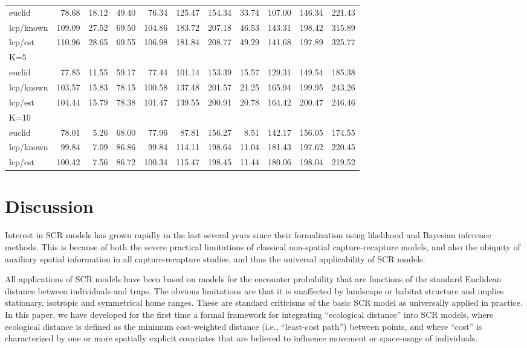 \documentclass[12pt]{article}
\begin{document}
\begin{table}[h]
{\begin{tabular}{lrrrrrrrrrr}
euclid   &  78.68 & 18.12& 49.40 & 76.34 & 125.47 & 154.34& 33.74& 107.00& 146.34& 221.43\\
lcp/known& 109.09 & 27.52& 69.50 &104.86 & 183.72 & 207.18& 46.53& 143.31& 198.42& 315.89\\
lcp/est  & 110.96 & 28.65& 69.55 &106.98 & 181.84 & 208.77& 49.29& 141.68& 197.89& 325.77\\
K=5      &        &      &       &       &        &       &      &       &       &        \\
euclid   &  77.85 & 11.55& 59.17 & 77.44 & 101.14 & 153.39& 15.57& 129.31& 149.54& 185.38\\
lcp/known& 103.57 & 15.83& 78.15 &100.58 & 137.48 & 201.57& 21.25& 165.94& 199.95& 243.26\\
lcp/est  & 104.44 & 15.79& 78.38 &101.47 & 139.55 & 200.91& 20.78& 164.42& 200.47& 246.46\\
K=10     &        &      &       &       &        &       &      &       &       &       \\
euclid   &  78.01 & 5.26 & 68.00 & 77.96 & 87.81  & 156.27&  8.51& 142.17& 156.05& 174.55\\
lcp/known&  99.84 & 7.09 & 86.86 & 99.84 & 114.11 & 198.64& 11.04& 181.43& 197.62& 220.45\\
lcp/est  & 100.42 & 7.56 & 86.72 &100.34 & 115.47 & 198.45& 11.44& 180.06& 198.04& 219.52\\
\end{tabular}
}
\end{table}


\section{Discussion}

Interest in SCR models has grown rapidly in the last several years
since their formalization using likelihood \citep{borchers_efford:2008}
and Bayesian \citep{royle_young:2008} inference methods. This is because
of both the severe practical limitations of classical non-spatial
capture-recapture models, and also the ubiquity of auxiliary spatial
information in all capture-recapture studies, and thus the universal
applicability of SCR models.

All applications of SCR models have been based on models for the
encounter probability that are functions of
the standard Euclidean distance between
individuals and traps. The obvious limitations are that it is
unaffected by landscape or habitat structure and implies
stationary,  isotropic and symmetrical home ranges. These are standard
criticisms of the basic SCR model as universally applied in practice.
In this paper,  we have developed for the first time a formal framework
for integrating
``ecological distance'' into SCR models, where ecological distance is
defined as the minimum cost-weighted distance (i.e., ``least-cost path'') between points, and where ``cost''
is characterized by one or more spatially explicit covariates that are
believed to influence movement or space-usage of individuals.
\end{document}
